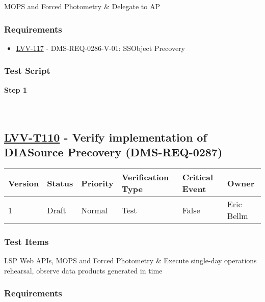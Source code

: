 MOPS and Forced Photometry \& Delegate to AP

\hypertarget{requirements-9}{%
\subsubsection{Requirements}\label{requirements-9}}

\begin{itemize}
\tightlist
\item
  \href{https://jira.lsstcorp.org/browse/LVV-117}{LVV-117} -
  DMS-REQ-0286-V-01: SSObject Precovery
\end{itemize}

\hypertarget{test-script-9}{%
\subsubsection{Test Script}\label{test-script-9}}

\textbf{Step 1}\\
~\\
~\\

\hypertarget{lvv-t110---verify-implementation-of-diasource-precovery-dms-req-0287}{%
\subsection{\texorpdfstring{\href{https://jira.lsstcorp.org/secure/Tests.jspa\#/testCase/LVV-T110}{LVV-T110}
- Verify implementation of DIASource Precovery
(DMS-REQ-0287)}{LVV-T110 - Verify implementation of DIASource Precovery (DMS-REQ-0287)}}\label{lvv-t110---verify-implementation-of-diasource-precovery-dms-req-0287}}

\begin{longtable}[]{@{}llllll@{}}
\toprule
Version & Status & Priority & Verification Type & Critical Event &
Owner\tabularnewline
\midrule
\endhead
1 & Draft & Normal & Test & False & Eric Bellm\tabularnewline
\bottomrule
\end{longtable}

\hypertarget{test-items-10}{%
\subsubsection{Test Items}\label{test-items-10}}

LSP Web APIs, MOPS and Forced Photometry \& Execute single-day
operations rehearsal, observe data products generated in time

\hypertarget{requirements-10}{%
\subsubsection{Requirements}\label{requirements-10}}

